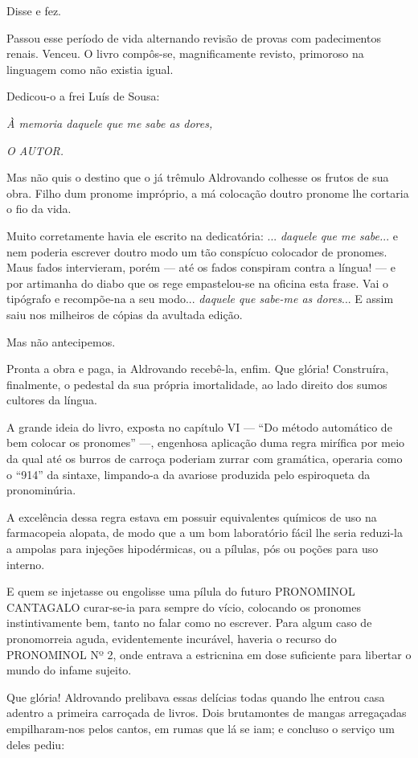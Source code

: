 Disse e fez.

Passou esse período de vida alternando revisão de provas com
padecimentos renais. Venceu. O livro compôs-se, magnificamente revisto,
primoroso na linguagem como não existia igual.

Dedicou-o a frei Luís de Sousa:

\emph{À memoria daquele que me sabe as dores,}

\emph{O AUTOR.}

Mas não quis o destino que o já trêmulo Aldrovando colhesse os frutos de
sua obra. Filho dum pronome impróprio, a má colocação doutro pronome lhe
cortaria o fio da vida.

Muito corretamente havia ele escrito na dedicatória: ... \emph{daquele
que me sabe.}.. e nem poderia escrever doutro modo um tão conspícuo
colocador de pronomes. Maus fados intervieram, porém --- até os fados
conspiram contra a língua! --- e por artimanha do diabo que os rege
empastelou-se na oficina esta frase. Vai o tipógrafo e recompõe-na a seu
modo... \emph{daquele que sabe-me as dores}... E assim saiu nos
milheiros de cópias da avultada edição.

Mas não antecipemos.

Pronta a obra e paga, ia Aldrovando recebê-la, enfim. Que glória!
Construíra, finalmente, o pedestal da sua própria imortalidade, ao lado
direito dos sumos cultores da língua.

A grande ideia do livro, exposta no capítulo VI --- ``Do método
automático de bem colocar os pronomes'' ---, engenhosa aplicação duma
regra mirífica por meio da qual até os burros de carroça poderiam zurrar
com gramática, operaria como o ``914'' da sintaxe, limpando-a da
avariose produzida pelo espiroqueta da pronominúria.

A excelência dessa regra estava em possuir equivalentes químicos de uso
na farmacopeia alopata, de modo que a um bom laboratório fácil lhe seria
reduzi-la a ampolas para injeções hipodérmicas, ou a pílulas, pós ou
poções para uso interno.

E quem se injetasse ou engolisse uma pílula do futuro PRONOMINOL
CANTAGALO curar-se-ia para sempre do vício, colocando os pronomes
instintivamente bem, tanto no falar como no escrever. Para algum caso de
pronomorreia aguda, evidentemente incurável, haveria o recurso do
PRONOMINOL Nº 2, onde entrava a estricnina em dose suficiente para
libertar o mundo do infame sujeito.

Que glória! Aldrovando prelibava essas delícias todas quando lhe entrou
casa adentro a primeira carroçada de livros. Dois brutamontes de mangas
arregaçadas empilharam-nos pelos cantos, em rumas que lá se iam; e
concluso o serviço um deles pediu:

